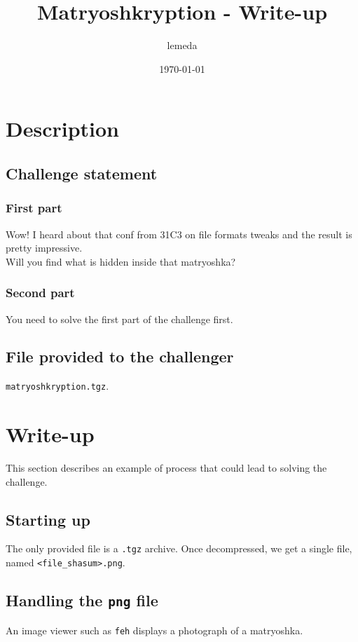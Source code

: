 \documentclass[12pt,a4paper]{article}
\author{lemeda}
\title{Matryoshkryption - Write-up}
\date{\today}
\begin{document}
\maketitle
\vspace{4em}

\section{Description}
    \subsection{Challenge statement}
        \subsubsection{First part}
    Wow! I heard about that conf from 31C3 on file formats tweaks and the result
    is pretty impressive.\\

    Will you find what is hidden inside that matryoshka?

        \subsubsection{Second part}
    You need to solve the first part of the challenge first.

    \subsection{File provided to the challenger}
        \texttt{matryoshkryption.tgz}.

\section{Write-up}
    This section describes an example of process that could lead to solving the
    challenge.\\

    \subsection{Starting up}
    The only provided file is a \texttt{.tgz} archive.
    Once decompressed, we get a single file, named \texttt{<file\_shasum>.png}.

    \subsection{Handling the \texttt{png} file}
    An image viewer such as \texttt{feh} displays a photograph of a matryoshka.
\end{document}
